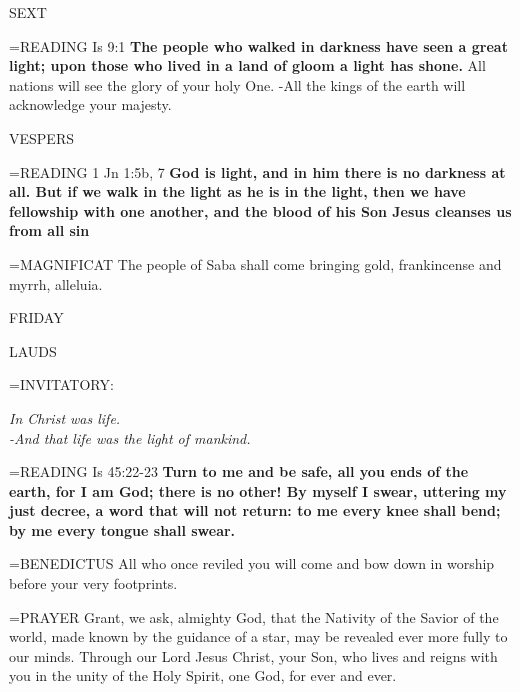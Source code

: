 \begin{flushleft}\normalsize SEXT\\\end{flushleft}
\hangindent=\parindent \small{READING}   Is 9:1 \textbf{  The people who walked in darkness have seen a great light; upon those who lived in a land of gloom a light has shone.}
All nations will see the glory of your holy One.
-All the kings of the earth will acknowledge your majesty.

\begin{flushleft}\normalsize VESPERS\\\end{flushleft}
\hangindent=\parindent \small{READING}   1 Jn 1:5b, 7 \textbf{   God is light, and in him there is no darkness at all. But if we walk in the light as he is in the light, then we have fellowship with one another, and the blood of his Son Jesus cleanses us from all sin\\}

\hangindent=\parindent \small{MAGNIFICAT 	The people of Saba shall come bringing gold, frankincense and myrrh, alleluia.\\}

\begin{center}
\normalsize FRIDAY
\end{center}

\begin{flushleft}\normalsize LAUDS\\\end{flushleft}
\hangindent=\parindent \small{INVITATORY:}
\begin{center}
\textit{In Christ was life.\\}
\textit{-And that life was the light of mankind.\\}
\end{center}

\hangindent=\parindent \small{READING}   Is 45:22-23 \textbf{  Turn to me and be safe, all you ends of the earth, for I am God; there is no other! By myself I swear, uttering my just decree, a word that will not return: to me every knee shall bend; by me every tongue shall swear.\\}

\hangindent=\parindent \small{BENEDICTUS 	All who once reviled you will come and bow down in worship before your very footprints.\\}

\hangindent=\parindent \small{PRAYER 	Grant, we ask, almighty God, that the Nativity of the Savior of the world, made known by the guidance of a star, may be revealed ever more fully to our minds. Through our Lord Jesus Christ, your Son, who lives and reigns with you in the unity of the Holy Spirit, one God, for ever and ever.}


